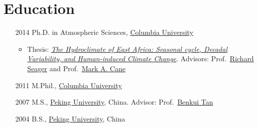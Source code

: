 \documentclass[11pt]{article}
\newcommand{\cu}{\href{http://www.columbia.edu}{Columbia University}}
\newcommand{\pku}{\href{http://english.pku.edu.cn}{Peking University}}
\newcommand{\benkui}{\href{http://www.phy.pku.edu.cn/personnel/das/bktan.xml}{Benkui Tan}}
\newcommand{\richard}{\href{http://www.ldeo.columbia.edu/res/div/ocp/people/seager/}{Richard Seager}}
\newcommand{\cane}{\href{http://www.ldeo.columbia.edu/user/mcane}{Mark A. Cane}}
\newcommand{\phdThesis}{\href{https://academiccommons.columbia.edu/catalog/ac:181305}{\textit{The Hydroclimate of East Africa: Seasonal cycle, Decadal Variability, and Human-induced Climate Change}}}
\begin{document}
\section{Education}
\begin{itemize}[leftmargin=10ex]
	\item[2014] Ph.D. in Atmospheric Sciences, \cu{}
	\begin{itemize}[leftmargin=0ex,label={},noitemsep,nolistsep]
		\item Thesis: \phdThesis{}.  Advisors: Prof.~\richard{} and Prof.~\cane{}
		\end{itemize}
	\item[2011] M.Phil., \cu{}
	\item[2007] M.S., \pku{}, China. Advisor: Prof.~\benkui{}
	\item[2004] B.S., \pku{}, China
	\end{itemize}
\end{document}
